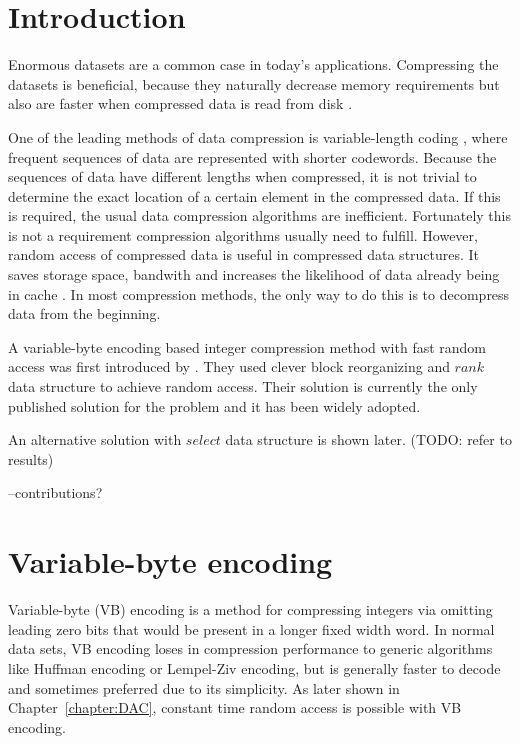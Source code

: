 \chapter{Introduction}
Enormous datasets are a common case in today's applications. Compressing the datasets is beneficial, because they 
naturally decrease memory requirements but also are faster when compressed data is read from disk \citep{Zob95}.

One of the leading methods of data compression is variable-length coding \citep{Sal99}, where frequent sequences of data
are represented with shorter codewords. Because the sequences of data have different lengths when compressed, it is 
not trivial to determine the exact location of a certain element in the compressed data. If this is required, the usual 
data compression algorithms are inefficient. Fortunately this is not a requirement compression algorithms usually need to fulfill. However, 
random access of compressed data is useful in compressed data structures. It saves storage space, bandwith and increases the likelihood
of data already being in cache \citep{Sch02}. In most compression methods, the only way to do this is to decompress data from the beginning. 

A variable-byte encoding based integer compression method with fast random access was first introduced by \citep{Bri09}. They used clever block 
reorganizing and $rank$ data structure to achieve random access. Their solution is currently the only published solution for the problem and it 
has been widely adopted.

An alternative solution with $select$ data structure is shown later. (TODO: refer to results)

--contributions?




\chapter{Variable-byte encoding}

Variable-byte (VB) encoding \citep{Wil99} is a method for compressing integers via omitting leading zero bits that would be present in a longer fixed 
width word. In normal data sets, VB encoding loses in compression performance to generic algorithms like Huffman encoding or Lempel-Ziv encoding, but 
is generally faster to decode \citep{Bri09} and sometimes preferred due to its simplicity. As later shown in Chapter~\ref{chapter:DAC}, constant time 
random access is possible with VB encoding.

